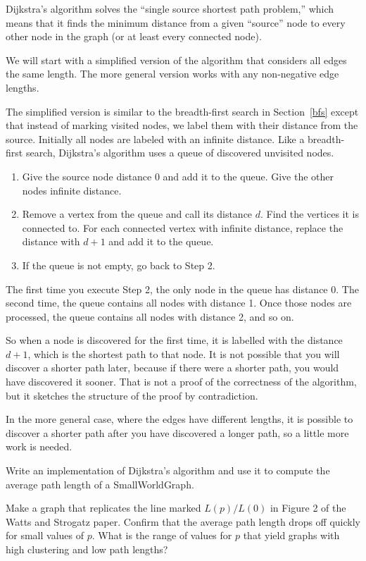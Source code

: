 \documentclass[10pt]{book}
\begin{document}
Dijkstra's algorithm solves the ``single source shortest path problem,''
which means that it finds the minimum distance from a given ``source''
node to every other node in the graph (or at least every connected
node).

We will start with a simplified version of the algorithm that
considers all edges the same length.  The more general version
works with any non-negative edge lengths.

The simplified version is similar to the breadth-first search
in Section~\ref{bfs} except that instead of marking visited nodes,
we label them with their distance from the source.  Initially
all nodes are labeled with an infinite distance.  Like a
breadth-first search, Dijkstra's algorithm uses a queue of
discovered unvisited nodes.

\begin{enumerate}

\item Give the source node distance 0 and add it to the queue.
Give the other nodes infinite distance.

\item Remove a vertex from the queue and call its distance $d$.  Find
  the vertices it is connected to.  For each connected vertex
  with infinite distance, replace the distance with $d+1$ and
  add it to the queue.

\item If the queue is not empty, go back to Step 2.

\end{enumerate}

The first time you execute Step 2, the only node in the queue
has distance 0.  The second time, the queue contains all
nodes with distance 1.  Once those nodes are processed, the
queue contains all nodes with distance 2, and so on.

So when a node is discovered for the first time, it is labelled
with the distance $d+1$, which is the shortest path to that
node.  It is not possible that you will discover a shorter
path later, because if there were a shorter path, you would
have discovered it sooner.  That is not a proof
of the correctness of the algorithm, but it sketches
the structure of the proof by contradiction.

In the more general case, where the edges have different lengths,
it is possible to discover a shorter path after you have
discovered a longer path, so a little more work is needed.

\begin{ex}

Write an implementation of Dijkstra's algorithm and use it
to compute the average path length of a SmallWorldGraph.

Make a graph that replicates the line marked $L(p)/L(0)$ in
Figure 2 of the Watts and Strogatz paper.  Confirm that the 
average path length drops off quickly for
small values of $p$.  What is the range of values for $p$
that yield graphs with high clustering and low path lengths?

\end{ex}
\end{document}
